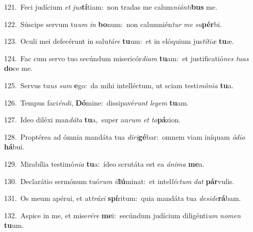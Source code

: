 {\numbfont\textcolor{\numbcolor}{121.}}~Feci judícium \textit{et} \textit{jus}\-\textbf{tí}tiam:~\star non tradas me calum\-\textit{ni}\-\textit{án}\textit{ti}\textbf{bus} me.\par
{\numbfont\textcolor{\numbcolor}{122.}}~Súscipe servum tu\textit{um} \textit{in} \textbf{bo}\-num:~\star non calumnién\textit{tur} \textit{me} \textit{su}\-\textbf{pér}bi.\par
{\numbfont\textcolor{\numbcolor}{123.}}~Oculi mei defecérunt in salu\-\textit{tá}\-\textit{re} \textbf{tu}\-um:~\star et in elóquium jus\-\textit{tí}\-\textit{ti}\textit{æ} \textbf{tu}\-æ.\par
{\numbfont\textcolor{\numbcolor}{124.}}~Fac cum servo tuo secúndum misericór\-\textit{di}\-\textit{am} \textbf{tu}\-am:~\star et justificatió\textit{nes} \textit{tu}\-\textit{as} \textbf{do}\-ce me.\par
{\numbfont\textcolor{\numbcolor}{125.}}~Servus tu\textit{us} \textit{sum} \textbf{e}\-go:~\star da mihi intelléctum, ut sciam testi\-\textit{mó}\-\textit{ni}\textit{a} \textbf{tu}\-a.\par
{\numbfont\textcolor{\numbcolor}{126.}}~Tempus faci\-\textit{én}\-\textit{di}, \textbf{Dó}\-mine:~\star dissipavé\textit{runt} \textit{le}\-\textit{gem} \textbf{tu}\-am.\par
{\numbfont\textcolor{\numbcolor}{127.}}~Ideo diléxi man\-\textit{dá}\-\textit{ta} \textbf{tu}\-a,~\star super au\textit{rum} \textit{et} \textit{to}\-\textbf{pá}zion.\par
{\numbfont\textcolor{\numbcolor}{128.}}~Proptérea ad ómnia mandáta tua \textit{di}\-\textit{ri}\textbf{gé}bar:~\star omnem viam iníquam \textit{ó}\-\textit{di}\textit{o} \textbf{há}\-bui.\par
{\numbfont\textcolor{\numbcolor}{129.}}~Mirabília testimó\-\textit{ni}\-\textit{a} \textbf{tu}\-a:~\star ídeo scrutáta est ea \textit{á}\-\textit{ni}\textit{ma} \textbf{me}\-a.\par
{\numbfont\textcolor{\numbcolor}{130.}}~Declarátio sermónum tuó\textit{rum} \textit{il}\-\textbf{lú}minat:~\star et intel\-\textit{léc}\-\textit{tum} \textit{dat} \textbf{pár}\-vulis.\par
{\numbfont\textcolor{\numbcolor}{131.}}~Os meum apérui, et at\-\textit{trá}\-\textit{xi} \textbf{spí}\-ritum:~\star quia mandáta tua \textit{de}\-\textit{si}\textit{de}\textbf{rá}bam.\par
{\numbfont\textcolor{\numbcolor}{132.}}~Aspice in me, et mise\-\textit{ré}\-\textit{re} \textbf{me}\-i:~\star secúndum judícium diligénti\textit{um} \textit{no}\-\textit{men} \textbf{tu}\-um.\par
